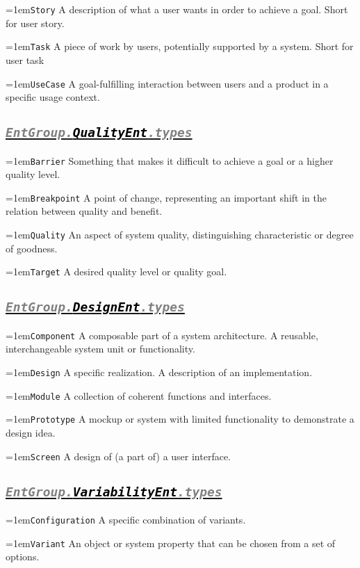 \documentclass[a4paper,oneside]{article}
\newcommand\Concept[2]{\hangindent=1em\lstinline+#1+ #2}
\begin{document}
\begin{multicols*}{4}
\Concept{Story}{A description of what a user wants in order to achieve a goal. Short for user story.}

\Concept{Task}{A piece of work by users, potentially supported by a system. Short for user task}

\Concept{UseCase}{A goal-fulfilling interaction between users and a product in a specific usage context.}


\subsection*{\underline{\texttt{\textit{{\textcolor{gray}{EntGroup.}\textcolor{black}{QualityEnt}}\textcolor{gray}{.types}}}}}
\Concept{Barrier}{Something that makes it difficult to achieve a goal or a higher quality level.}

\Concept{Breakpoint}{A point of change, representing an important shift in the relation between quality and benefit.}

\Concept{Quality}{An aspect of system quality, distinguishing characteristic or degree of goodness.}

\Concept{Target}{A desired quality level or quality goal.}


\subsection*{\underline{\texttt{\textit{{\textcolor{gray}{EntGroup.}\textcolor{black}{DesignEnt}}\textcolor{gray}{.types}}}}}
\Concept{Component}{A composable part of a system architecture. A reusable, interchangeable system unit or functionality.}

\Concept{Design}{A specific realization. A description of an implementation.}

\Concept{Module}{A collection of coherent functions and interfaces.}

\Concept{Prototype}{A mockup or system with limited functionality to demonstrate a design idea.}

\Concept{Screen}{A design of (a part of) a user interface.}


\subsection*{\underline{\texttt{\textit{{\textcolor{gray}{EntGroup.}\textcolor{black}{VariabilityEnt}}\textcolor{gray}{.types}}}}}
\Concept{Configuration}{A specific combination of variants.}

\Concept{Variant}{An object or system property that can be chosen from a set of options.}


\end{multicols*}
\end{document}
